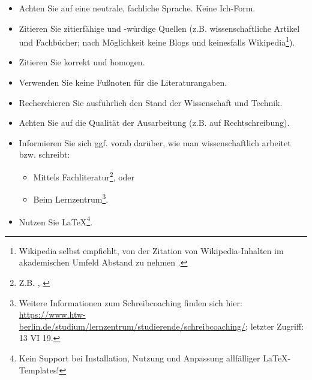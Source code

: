 \documentclass[oneside,bibliography=totocnumbered,BCOR=5mm]{scrbook}%
\theoremstyle{definition}
\theoremstyle{definition}
\theoremstyle{definition}
\theoremstyle{definition}
\theoremstyle{definition}
\theoremstyle{definition}
\begin{document}
\begin{itemize}
\item Achten Sie auf eine neutrale, fachliche Sprache. Keine \glqq{}Ich\grqq{}-Form.
\item Zitieren Sie zitierf\"ahige und -w\"urdige Quellen (z.B. wissenschaftliche Artikel und Fachb\"ucher; nach M\"oglichkeit keine Blogs und keinesfalls Wikipedia\footnote{Wikipedia selbst empfiehlt, von der Zitation von Wikipedia-Inhalten im akademischen Umfeld Abstand zu nehmen \autocite{wikipedia2019}.}). 
\item Zitieren Sie korrekt und homogen.
\item Verwenden Sie keine Fu{\ss}noten f\"ur die Literaturangaben.
\item Recherchieren Sie ausf\"uhrlich den Stand der Wissenschaft und Technik.
\item Achten Sie auf die Qualit\"at der Ausarbeitung (z.B. auf Rechtschreibung).
\item Informieren Sie sich ggf. vorab dar\"uber, wie man wissenschaftlich arbeitet bzw. schreibt:
\begin{itemize}
\item Mittels Fachliteratur\footnote{Z.B. \autocite{balzert2011}, \autocite{franck2013}}, oder
\item Beim Lernzentrum\footnote{Weitere Informationen zum Schreibcoaching finden sich hier: \url{https://www.htw-berlin.de/studium/lernzentrum/studierende/schreibcoaching/}; letzter Zugriff: 13 VI 19.}.
\end{itemize}
\item Nutzen Sie \LaTeX\footnote{Kein Support bei Installation, Nutzung und Anpassung allf\"alliger \LaTeX-Templates!}.
\end{itemize}



\newpage
\thispagestyle{empty}      
\noindent


\end{document}
